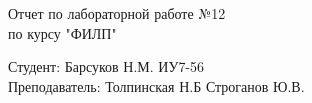 \documentclass[a4paper, 14pt]{article}
\begin{document}
	\begin{titlepage}
		\begin{center}
			\begin{LARGE}
				Отчет по лабораторной работе №12\\
				по курсу "ФИЛП"\\
			\end{LARGE}
			
			\begin{Large}
				\vspace{10cm}
				Студент: Барсуков Н.М. ИУ7-56\\
				Преподаватель: Толпинская Н.Б
				Строганов Ю.В.
			\end{Large}
		\end{center}
	\end{titlepage}

	\newpage
	\tableofcontents
\end{document}
